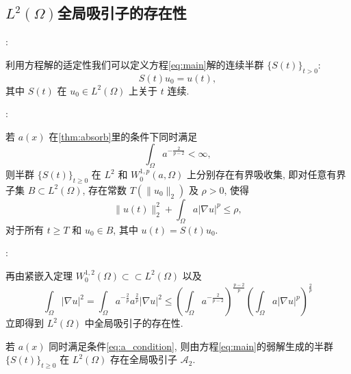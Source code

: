 \documentclass[UTF8]{ctexbeamer}
\newcommand*\abs[1]{\lvert#1\rvert}
\newcommand*\norm[1]{\lVert#1\rVert}
\newcommand*\Brace[1]{\lbrace#1\rbrace}
\begin{document}
\subsection{\texorpdfstring{$L^2(\Omega)$}上全局吸引子的存在性}
\begin{frame}{\secname : \subsecname}

    利用方程解的适定性我们可以定义方程\eqref{eq:main}解的连续半群 $\Brace{S(t)}_{t>0}$:
    \begin{equation*}
        S(t)u_0 = u(t),
    \end{equation*}
    其中 $S(t)$ 在 $u_{0} \in L^2(\Omega)$ 上关于 $t$ 连续.

\end{frame}
\begin{frame}{\secname : \subsecname}

    \begin{theorem}\label{thm:real_absorb}
        若 $a(x)$ 在\cref{thm:absorb}里的条件下同时满足
        \begin{equation}\label{eq:a_condition}
            \int_{\Omega}a^{-\frac{2}{p-2}} < \infty,
        \end{equation}
        则半群 $\Brace{S(t)}_{t \geq 0} $ 在
        $L^2$ 和 $W_0^{1,p}(a,\Omega)$ 上分别存在有界吸收集, 即对任意有界子集
        $B \subset L^2(\Omega)$, 存在常数 $T(\norm{u_0}_2)$ 及 $\rho > 0$, 使得
        \begin{equation*}
            \norm{u(t)}_2^2 + \int_{\Omega}a\abs{\nabla u}^p \leq \rho,
        \end{equation*}
        对于所有 $t \geq T$ 和 $u_0 \in B$, 其中 $u(t) = S(t)u_0$.
    \end{theorem}

\end{frame}
\begin{frame}{\secname : \subsecname}

    再由紧嵌入定理
    $W_0^{1,2}(\Omega) \subset\subset L^2(\Omega)$
    以及
    \begin{equation}\label{eq:DL2_bd_W1pa}
		\int_{\Omega}\abs{\nabla u}^2
		= \int_{\Omega}a^{-\frac{2}{p}}a^{\frac{2}{p}}\abs{\nabla u}^2
		\leq \left(\int_{\Omega}a^{-\frac{2}{p-2}}\right)^{\frac{p-2}{p}}
		\left(\int_{\Omega}a\abs{\nabla u}^p\right)^{\frac{2}{p}}
	\end{equation}
    立即得到 $L^2(\Omega)$ 中全局吸引子的存在性.
    \begin{theorem}\label{thm:attractor_L2}
        若 $a(x)$ 同时满足条件\eqref{eq:a_condition},
        则由方程\eqref{eq:main}的弱解生成的半群 $\Brace{S(t)}_{t \geq 0}$ 在
        $L^2(\Omega)$ 存在全局吸引子 $\mathcal{A}_2$.
    \end{theorem}

\end{frame}
\end{document}
